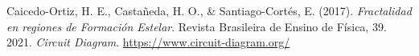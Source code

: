 \documentclass[conference]{IEEEtran}
\begin{document}
    
    
    
\begin{thebibliography}{00}
 Caicedo-Ortiz, H. E., Castañeda, H. O., \& Santiago-Cortés, E. (2017). \textit{Fractalidad en regiones de Formación Estelar}. Revista Brasileira de Ensino de Física, 39.
 2021. \textit{Circuit Diagram}. \url{https://www.circuit-diagram.org/}
\end{thebibliography}
\end{document}
